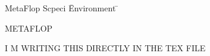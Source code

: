 \documentclass[a4paper]{report}
\begin{document}
\pagestyle{empty}
\tt       %

\scriptsize

\begin{multicols}{4}
\raggedcolumns
\noindent
\begin{tabbing}

MetaFlop Scpeci \= Environment \= \kill

METAFLOP \\  %

\end{tabbing}
\end{multicols}
\noindent
\vspace{.5cm}
\hrulefill
\vspace{2cm}


\noindent 
 \begin{center}

I M WRITING THIS DIRECTLY IN THE TEX FILE

\end{center}
\end{document}
